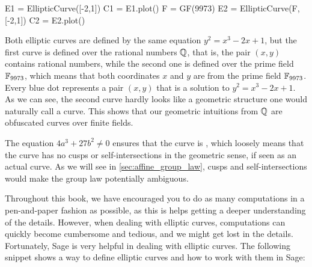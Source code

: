 \medskip

\begin{sagesilent}
E1 = EllipticCurve([-2,1])
C1 = E1.plot()
F = GF(9973)
E2 = EllipticCurve(F, [-2,1])
C2 = E2.plot()
\end{sagesilent}
\begin{minipage}{0.48\textwidth}
\end{minipage}
%
\begin{minipage}{0.48\textwidth}
\label{plot:elliptic_curve}
\end{minipage}

Both elliptic curves are defined by the same  equation $y^2 = x^3-2x+1$, but the first curve is defined over the rational numbers $\mathbb{Q}$, that is, the pair $(x,y)$ contains rational numbers, while the second one is defined over the prime field $\mathbb{F}_{9973}$, which means that both coordinates $x$ and $y$ are from the prime field $\mathbb{F}_{9973}$. Every blue dot represents a pair $(x,y)$ that is a solution to $y^2 = x^3-2x+1$. As we can see, the second curve hardly looks like a geometric structure one would naturally call a curve. This shows that our geometric intuitions from $\mathbb{Q}$ are obfuscated curves over finite fields.

The equation $4a^3+ 27b^2\neq 0$ ensures that the curve is  , which loosely means that the curve has no cusps or self-intersections in the geometric sense, if seen as an actual curve. As we will see in \ref{sec:affine_group_law}, cusps and self-intersections would make the group law potentially ambiguous.

Throughout this book, we have encouraged you to do as many computations in a pen-and-paper fashion as possible, as this is helps getting a deeper understanding of the details. However, when dealing with elliptic curves, computations can quickly become cumbersome and tedious, and we might get lost in the details. Fortunately, Sage is very helpful in dealing with elliptic curves. The following snippet shows a way to define elliptic curves and how to work with them in Sage:

